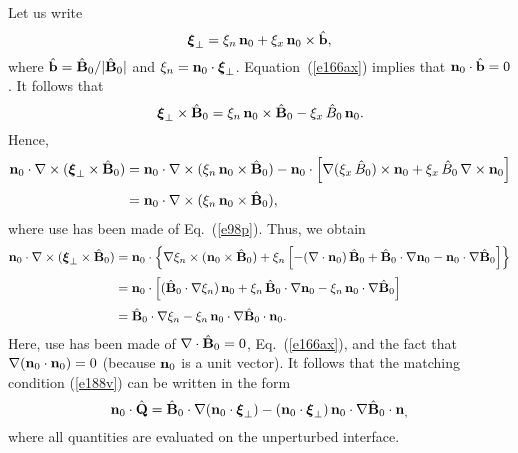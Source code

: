 \documentclass[12pt,prb,aps,notitlepage]{revtex4-1}
\newcommand{\bxi}{\mbox{\boldmath$\xi$}}
\begin{document}
Let us write
\begin{equation}
\bxi_\perp = \xi_n\,{\bf n}_0 + \xi_x\,{\bf n}_0\times \hat{\bf b},
\end{equation}
where $\hat{\bf b} = \hat{\bf B}_0/|\hat{\bf B}_0|$ and $\xi_n= {\bf n}_0\cdot\bxi_\perp$. Equation~(\ref{e166ax}) implies that ${\bf n}_0\cdot\hat{\bf b}=0$. 
  It follows that
\begin{equation}
\bxi_\perp\times \hat{\bf B}_0 = \xi_n\,{\bf n}_0\times \hat{\bf B}_0 -\xi_x\,\hat{B}_0\,{\bf n}_0.
\end{equation}
Hence,
\begin{align}
{\bf n}_0\cdot\nabla\times(\bxi_\perp\times \hat{\bf B}_0)& ={\bf n}_0\cdot\nabla\times (\xi_n\,{\bf n}_0\times\hat{\bf B}_0)
- {\bf n}_0\cdot\left[\nabla(\xi_x\,\hat{B}_0)\times {\bf n}_0+\xi_x\,\hat{B}_0\,\nabla\times {\bf n}_0\right]\nonumber\\[0.5ex]
&= {\bf n}_0\cdot\nabla\times (\xi_n\,{\bf n}_0\times\hat{\bf B}_0),
\end{align}
where use has been made of Eq.~(\ref{e98p}). Thus, we obtain
\begin{align}
{\bf n}_0\cdot\nabla\times(\bxi_\perp\times \hat{\bf B}_0)&= {\bf n}_0\cdot\left\{\nabla\xi_n\times ({\bf n}_0\times \hat{\bf B}_0)
+\xi_n\left[-(\nabla\cdot{\bf n}_0)\,\hat{\bf B}_0 + \hat{\bf B}_0\cdot\nabla{\bf n}_0 - {\bf n}_0\cdot\nabla\hat{\bf B}_0\right]\right\}\nonumber\\[0.5ex]
&= {\bf n}_0\cdot\left[(\hat{\bf B}_0\cdot\nabla\xi_n)\,{\bf n}_0 + \xi_n\,\hat{\bf B}_0\cdot\nabla{\bf n}_0 -\xi_n\,{\bf n}_0\cdot\nabla\hat{\bf B}_0\right]\nonumber\\[0.5ex]
&= \hat{\bf B}_0\cdot\nabla\xi_n -\xi_n\,{\bf n}_0\cdot\nabla \hat{\bf B}_0\cdot{\bf n}_0.
\end{align}
Here, use has been made of $\nabla\cdot\hat{\bf B}_0=0$, Eq.~(\ref{e166ax}), and  the fact that $\nabla ({\bf n}_0\cdot{\bf n}_0)=0$
(because ${\bf n}_0$ is a unit vector). It follows that the matching condition (\ref{e188v}) can be written in the form
\begin{equation}
{\bf n}_0\cdot\hat{\bf Q} =\hat{\bf B}_0\cdot\nabla({\bf n}_0\cdot\bxi_\perp) -({\bf n}_0\cdot\bxi_\perp)\,{\bf n}_0\cdot\nabla \hat{\bf B}_0\cdot{\bf n}_,
\end{equation}
where all quantities are evaluated on the unperturbed interface. 
\end{document}
